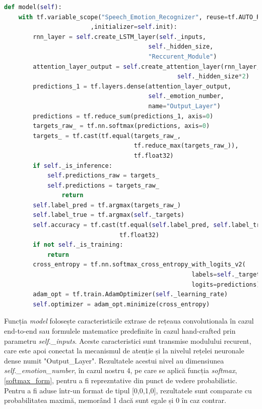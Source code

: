 \documentclass[a4paper,12pt]{book}
\begin{document}
		\begin{lstlisting}[language=Python, caption={Functia care creaza graficul de executie Tensorflow, conectand toate componentele de procesare ale sistemului SER.}]	
def model(self):
	with tf.variable_scope("Speech_Emotion_Recognizer", reuse=tf.AUTO_REUSE
						,initializer=self.init):
		rnn_layer = self.create_LSTM_layer(self._inputs, 
										self._hidden_size, 
										"Reccurent_Module")		
		attention_layer_output = self.create_attention_layer(rnn_layer, 
												self._hidden_size*2)
		predictions_1 = tf.layers.dense(attention_layer_output, 
										self._emotion_number, 
										name="Output_Layer")
		predictions = tf.reduce_sum(predictions_1, axis=0)		
		targets_raw_ = tf.nn.softmax(predictions, axis=0)		
		targets_ = tf.cast(tf.equal(targets_raw_, 
									tf.reduce_max(targets_raw_)), 
									tf.float32)
		if self._is_inference:
			self.predictions_raw = targets_
			self.predictions = targets_raw_
				return					
		self.label_pred = tf.argmax(targets_raw_)
		self.label_true = tf.argmax(self._targets)		
		self.accuracy = tf.cast(tf.equal(self.label_pred, self.label_true),
								tf.float32)
		if not self._is_training:
			return
		cross_entropy = tf.nn.softmax_cross_entropy_with_logits_v2(
													labels=self._targets, 
													logits=predictions)	
		adam_opt = tf.train.AdamOptimizer(self._learning_rate)
		self.optimizer = adam_opt.minimize(cross_entropy)	\end{lstlisting}
		Funcția \textit{model} folosește caracteristicile extrase de rețeaua convolutionala în cazul end-to-end sau formulele matematice predefinite în cazul hand-crafted prin parametru \textit{self.\_inputs}. Aceste caracteristici sunt transmise modulului recurent, care este apoi conectat la mecanismul de atenție și la nivelul rețelei neuronale dense numit "Output\_Layer". Rezultatele acestui nivel au dimensiunea \textit{self.\_emotion\_number}, în cazul nostru 4, pe care se aplică funcția \textit{softmax}, \ref{softmax_form}, pentru a fi reprezntative din punct de vedere probabilistic. Pentru a fi aduse într-un format de tipul [0,0,1,0], rezultatele sunt comparate cu probabilitatea maximă, memorând 1 dacă sunt egale și 0 în caz contrar. \par
		
\end{document}
